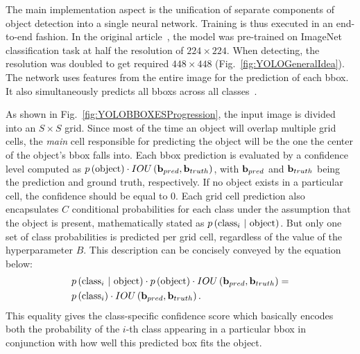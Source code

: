 The main implementation aspect is the unification of separate components of object detection into a single neural network. Training is thus executed in an end-to-end fashion. In the original article~\cite{Redmon2016}, the model was pre-trained on ImageNet~\cite{imagenet_cvpr09} classification task at half the resolution of $224 \times 224$. When detecting, the resolution was doubled to get required $448 \times 448$ (Fig.~\ref{fig:YOLOGeneralIdea}). The network uses features from the entire image for the prediction of each \gls{bbox}. It also simultaneously predicts all \glspl{bbox} across all classes~\cite{Redmon2016}.

As shown in Fig.~\ref{fig:YOLOBBOXESProgression}, the input image is divided into an $S \times S$ grid. Since most of the time an object will overlap multiple grid cells, the \emph{main} cell responsible for predicting the object will be the one the center of the object's \gls{bbox} falls into. Each \gls{bbox} prediction is evaluated by a confidence level computed as $p \left( \text{object} \right) \cdot {IOU} \left( \mathbf{b}_{pred}, \mathbf{b}_{truth} \right)$, with $\mathbf{b}_{pred}$ and $\mathbf{b}_{truth}$ being the prediction and ground truth, respectively. If no object exists in a particular cell, the confidence should be equal to $0$. Each grid cell prediction also encapsulates $C$ conditional probabilities for each class under the assumption that the object is present, mathematically stated as $p \left( {\text{class}}_i \ | \ \text{object} \right)$. But only one set of class probabilities is predicted per grid cell, regardless of the value of the hyperparameter $B$. This description can be concisely conveyed by the equation below:
\begin{equation}
    \begin{aligned}
        \label{eq:YOLOCOnfidenceScores}
        &p \left( {\text{class}}_i \ | \ \text{object} \right)
        \cdot
        p \left( \text{object} \right)
        \cdot
        {IOU} \left( \mathbf{b}_{pred}, \mathbf{b}_{truth} \right)
        =\\
        &p \left( {\text{class}}_i \right)
        \cdot
        {IOU} \left( \mathbf{b}_{pred}, \mathbf{b}_{truth} \right).
    \end{aligned}
\end{equation}
This equality gives the class-specific confidence score which basically encodes both the probability of the $i$-th class appearing in a particular \gls{bbox} in conjunction with how well this predicted box fits the object.

